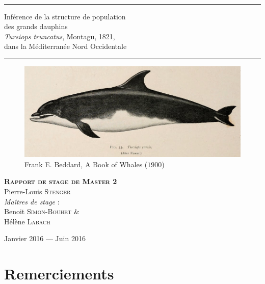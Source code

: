 \documentclass[a4paper,12pt,twoside]{article}\usepackage[]{graphicx}\usepackage[]{color}
\begin{document}
\begin{titlepage}
\begin{sffamily}
\begin{center}
   \\[2cm]
   
      \rule[0.5ex]{\textwidth}{0.1mm}

    { \huge Inférence de la structure de population \\des grands dauphins \\
	\emph{Tursiops truncatus}, Montagu, 1821, \\
	dans la Méditerranée Nord Occidentale\\[0.4cm] }
	
   \rule[0.5ex]{\textwidth}{0.1mm}
   
   \begin{figure}[htbp]
   	\centering
   		\includegraphics[width=\textwidth]{tursiops}
   	\small{Frank E. Beddard, A Book of Whales ($1900$)}
   \end{figure}
   
    \textbf{\textsc{ Rapport de stage de Master 2}}\\[1cm]
	
\textrm{\Large{Pierre-Louis}} \textsc{\Large{Stenger}}\\[1cm]

        \emph{Maîtres de stage} : \\
		
		\textrm{\large{Benoit}} \textsc{\large{Simon-Bouhet}}
		\& \\
		\textrm{\large{Hélène}} \textsc{\large{Labach}}

    \vfill
    {\large Janvier 2016 — Juin 2016}

  \end{center}
  \end{sffamily}
\end{titlepage}



 \setcounter{page}{1} 
\frontmatter
\part*{Remerciements}
\end{document}
